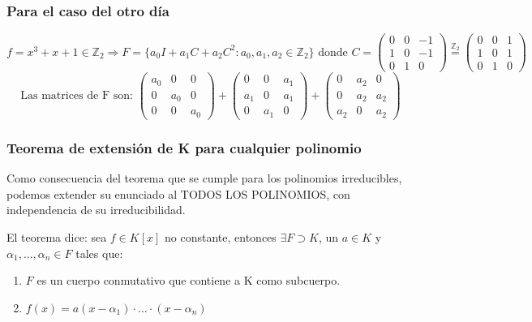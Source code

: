 \documentclass[10pt,a4paper,openright]{book}
\begin{document}
\subsubsection*{Para el caso del otro día}
$$f=x^3+x+1\in \mathbb Z_2\Rightarrow F=\{a_0I+a_1C+a_2C^2: a_0,a_1,a_2\in \mathbb Z_2\}\mbox{ donde } C=\left(\begin{array}{ccc} 0 & 0 & -1 \\ 1 & 0 & -1 \\0 & 1 & 0 \end{array}\right)\stackrel{\mathbb Z_2}{=}\left(\begin{array}{ccc} 0 & 0 & 1 \\ 1 & 0 & 1 \\0 & 1 & 0 \end{array}\right)$$
$$\mbox{Las matrices de F son: }\left(\begin{array}{ccc} a_0 & 0 & 0 \\ 0 & a_0 & 0 \\0 & 0 & a_0 \end{array}\right)+\left(\begin{array}{ccc} 0 & 0 & a_1 \\ a_1 & 0 & a_1 \\0 & a_1 & 0 \end{array}\right)+\left(\begin{array}{ccc} 0 & a_2 & 0 \\ 0 & a_2 & a_2 \\a_2 & 0 & a_2 \end{array}\right)$$

\subsubsection*{Teorema de extensión de K para cualquier polinomio}
Como consecuencia del teorema que se cumple para los polinomios irreducibles, podemos extender su enunciado al TODOS LOS POLINOMIOS, con independencia de su irreducibilidad.\par
El teorema dice: sea $f\in K[x]$ no constante, entonces $\exists F\supset K$, un $a\in K$ y $\alpha_1, ..., \alpha_n\in F$ tales que:
\begin{enumerate}
\item $F$ es un cuerpo conmutativo que contiene a K como subcuerpo.
\item $f(x)=a(x-\alpha_1)\cdot ... \cdot (x-\alpha_n)$
\end{enumerate}
\end{document}

